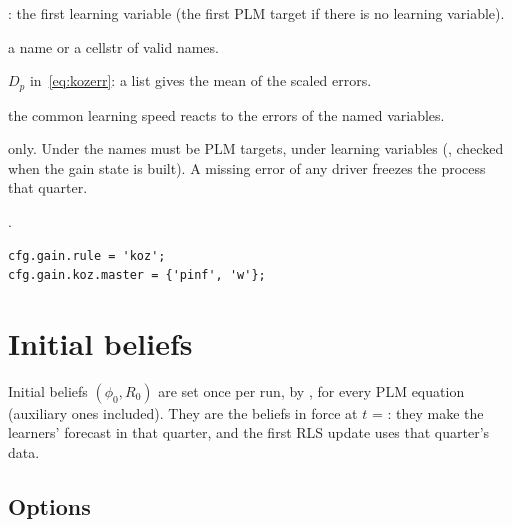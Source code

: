 \documentclass[11pt,a4paper]{article}
\DeclareRobustCommand{\codem}[1]{\texttt{\detokenize{#1}}}
\newenvironment{optspec}%
  {\begin{description}[style=sameline,leftmargin=2.7cm,labelwidth=2.5cm,font=\normalfont\itshape]}%
  {\end{description}}
\begin{document}
\subsubsection{\texorpdfstring{\codem{gain.koz.master}}{gain.koz.master}}\label{opt:gain-koz-master}
\begin{optspec}
  \item[Default] : the first learning variable (the first PLM target if there is no
        learning variable).
  \item[Values] a name or a cellstr of valid names.
  \item[Math] $D_p$ in~\eqref{eq:kozerr}: a list gives the mean of the scaled errors.
  \item[Assumptions] the common learning speed reacts to the errors of the named variables.
  \item[Interactions]  only. Under  the names must be PLM targets,
        under  learning variables (, checked when
        the gain state is built). A missing error of any driver freezes the process that
        quarter.
  \item[Code] .
  \item[Example]
\begin{lstlisting}
cfg.gain.rule = 'koz';
cfg.gain.koz.master = {'pinf', 'w'};
\end{lstlisting}
\end{optspec}

\section{Initial beliefs}\label{sec:init}

Initial beliefs $(\phi_0, R_0)$ are set once per run, by , for every
PLM equation (auxiliary ones included). They are the beliefs in force at
$t$ = : they make the learners' forecast in that quarter, and the first
RLS update uses that quarter's data.

\subsection{Options}
\end{document}
